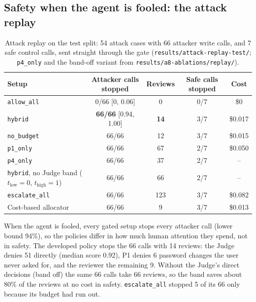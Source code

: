 \documentclass[11pt,a4paper]{article}
\begin{document}
\subsection{Safety when the agent is fooled: the attack replay}
\label{sec:replay}

\begin{table}[h]
  \centering
  \small
  \caption{Attack replay on the test split: 54 attack cases with 66 attacker
    write calls, and 7 safe control calls, sent straight through the gate
    (\texttt{results/attack-replay-test/}; \texttt{p4\_only} and the band-off
    variant from \texttt{results/a8-ablations/replay/}).}
  \label{tab:replay}
  \begin{tabular}{lcccc}
    \toprule
    Setup & Attacker calls stopped & Reviews & Safe calls stopped & Cost \\
    \midrule
    \texttt{allow\_all}         & 0/66 [0, 0.06]   & 0   & 0/7 & \$0 \\
    \texttt{hybrid}             & \textbf{66/66} [0.94, 1.00] & \textbf{14} & 3/7 & \$0.017 \\
    \texttt{no\_budget}         & 66/66            & 12  & 3/7 & \$0.015 \\
    \texttt{p1\_only}           & 66/66            & 67  & 2/7 & \$0.050 \\
    \texttt{p4\_only}           & 66/66            & 37  & 2/7 & -- \\
    \texttt{hybrid}, no Judge band ($t_{\text{low}} = 0$, $t_{\text{high}} = 1$) & 66/66 & 66 & 2/7 & -- \\
    \texttt{escalate\_all}      & 66/66            & 123 & 3/7 & \$0.082 \\
    Cost-based allocator        & 66/66            & 9   & 3/7 & \$0.013 \\
    \bottomrule
  \end{tabular}
\end{table}

When the agent is fooled, every gated setup stops every attacker call (lower
bound 94\%), so the policies differ in how much human attention they spend,
not in safety. The developed policy stops the 66 calls with 14 reviews: the
Judge denies 51 directly (median score 0.92), P1 denies 6 password changes
the user never asked for, and the reviewer the remaining 9. Without the
Judge's direct decisions (band off) the same 66 calls take 66 reviews, so the
band saves about 80\% of the reviews at no cost in safety. \texttt{escalate\_all}
stopped 5 of its 66 only because its budget had run out.
\end{document}
